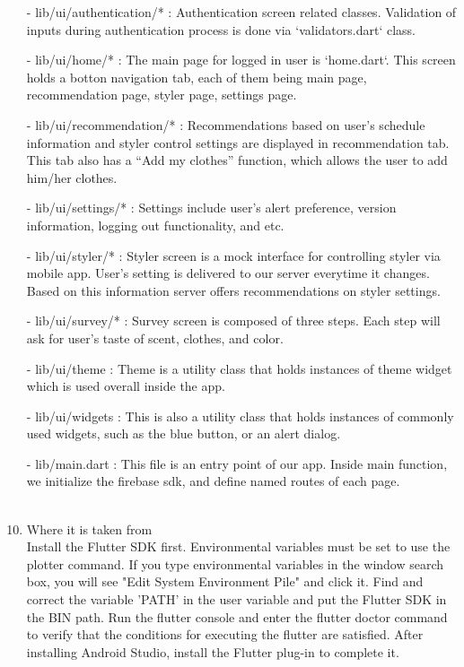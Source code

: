 \documentclass[conference]{IEEEtran}
\begin{document}
\begin{enumerate}
        \item[-] lib/ui/authentication/* : Authentication screen related classes. Validation of inputs during authentication process is done via  `validators.dart` class. \\
        \item[-] lib/ui/home/* : The main page for logged in user is `home.dart`. This screen holds a botton navigation tab, each of them being main page, recommendation page, styler page, settings page. \\
        \item[-] lib/ui/recommendation/* : Recommendations based on user’s schedule information and styler control settings are displayed in recommendation tab. This tab also has a “Add my clothes” function, which allows the user to add him/her clothes. \\
        \item[-] lib/ui/settings/* : Settings include user’s alert preference, version information, logging out functionality, and etc. \\
        \item[-] lib/ui/styler/* : Styler screen is a mock interface for controlling styler via mobile app. User’s setting is delivered to our server everytime it changes. Based on this information server offers recommendations on styler settings. \\
        \item[-] lib/ui/survey/* : Survey screen is composed of three steps. Each step will ask for user’s taste of scent, clothes, and color. \\
        \item[-] lib/ui/theme : Theme is a utility class that holds instances of theme widget which is used overall inside the app. \\
        \item[-] lib/ui/widgets : This is also a utility class that holds instances of commonly used widgets, such as the blue button, or an alert dialog. \\
        \item[-] lib/main.dart : This file is an entry point of our app. Inside main function, we initialize the firebase sdk, and define named routes of each page.  \\ \\
    \item Where it is taken from\\
    Install the Flutter SDK first. Environmental variables must be set to use the plotter command. If you type environmental variables in the window search box, you will see "Edit System Environment Pile" and click it. Find and correct the variable 'PATH' in the user variable and put the Flutter SDK in the BIN path. Run the flutter console and enter the flutter doctor command to verify that the conditions for executing the flutter are satisfied. After installing Android Studio, install the Flutter plug-in to complete it.\\ \\

\end{enumerate}
\end{document}
